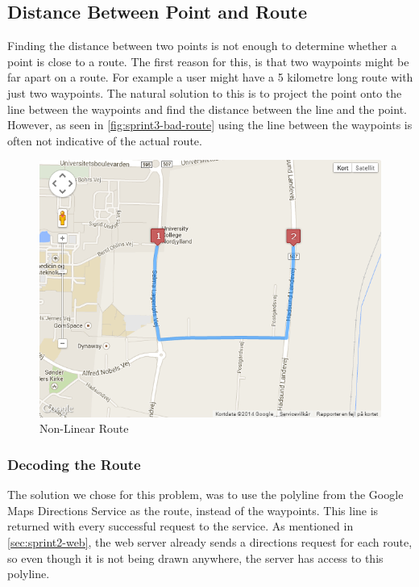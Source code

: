 \subsection{Distance Between Point and Route}
Finding the distance between two points is not enough to determine whether a point is close to a route. The first reason for this, is that two waypoints might be far apart on a route. For example a user might have a 5 kilometre long route with just two waypoints. The natural solution to this is to project the point onto the line between the waypoints and find the distance between the line and the point. However, as seen in \autoref{fig:sprint3-bad-route} using the line between the waypoints is often not indicative of the actual route.

\begin{figure}[!ht]
	\centering
	\includegraphics[scale=0.5]{img/sprint3br.png}
	\caption{Non-Linear Route}
	\label{fig:sprint3-bad-route}
\end{figure}

\subsubsection{Decoding the Route}
The solution we chose for this problem, was to use the polyline from the Google Maps Directions Service as the route, instead of the waypoints. This line is returned with every successful request to the service. As mentioned in \autoref{sec:sprint2-web}, the web server already sends a directions request for each route, so even though it is not being drawn anywhere, the server has access to this polyline. 

